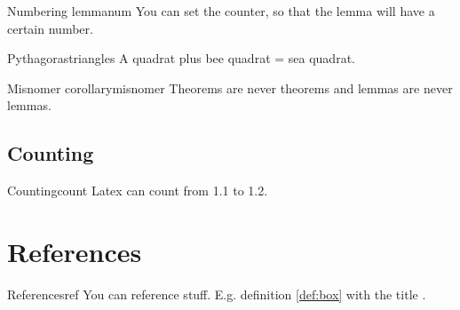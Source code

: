 \begin{lemma}{Numbering lemma}{num}
  You can set the counter, so that the lemma will have a certain number.
\end{lemma}

\begin{satz}{Pythagoras}{triangles}
  A quadrat plus bee quadrat = sea quadrat.
\end{satz}

\begin{theorem}{Misnomer corollary}{misnomer}
  Theorems are never theorems and lemmas are never lemmas.
\end{theorem}

\subsection{Counting}

\begin{axiom}{Counting}{count}
  Latex can count from 1.1 to 1.2.
\end{axiom}

\section{References}

\begin{corollary}{References}{ref}
  You can reference stuff. E.g. definition \ref{def:box} with the title .
\end{corollary}


